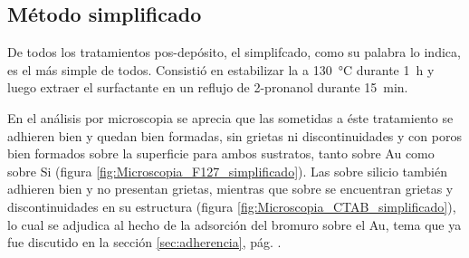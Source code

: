 	
	 \subsection{Método simplificado}

		 	De todos los tratamientos pos-depósito, el simplifcado, como su palabra lo indica, es el más simple de todos. Consistió en estabilizar la \pdm a \SI{130}{\celsius} durante \SI{1}{\hour} y luego extraer el surfactante en un reflujo de 2-pronanol durante \SI{15}{\minute}. 
			
			En el análisis por microscopia se aprecia que las \pdmF\space sometidas a éste tratamiento se adhieren bien y quedan bien formadas, sin grietas ni discontinuidades y con poros bien formados sobre la superficie para ambos sustratos, tanto sobre Au como sobre Si (figura \ref{fig:Microscopia_F127_simplificado}). Las \pdmC\space sobre silicio también adhieren bien y no presentan grietas, mientras que sobre se encuentran grietas y discontinuidades en su estructura (figura \ref{fig:Microscopia_CTAB_simplificado}), lo cual se adjudica al hecho de la adsorción del bromuro sobre el Au, tema que ya fue discutido en la sección \ref{sec:adherencia}, pág. \pageref{sec:adherencia}. 
			
